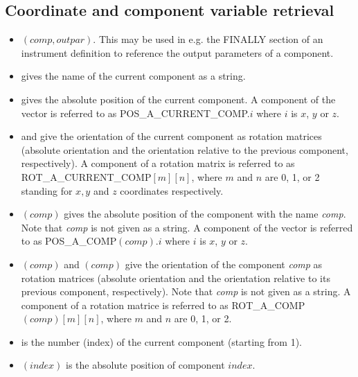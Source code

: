 \subsection{Coordinate and component variable retrieval}

\begin{itemize}
\item {}$(comp, outpar)$. This may be used in e.g. the FINALLY section of an
  instrument definition to reference the output parameters of a
  component.
\item {} gives the name of the current component as a string.
\item {} gives the absolute position of the
  current component. A component of the vector is referred to as
  POS\_A\_CURRENT\_COMP.$i$ where $i$ is $x$, $y$ or $z$.
\item {} and
   give the orientation
  of the current component as rotation matrices
  (absolute orientation and the orientation relative to
  the previous component, respectively). A
  component of a rotation matrix is referred to as
  ROT\_A\_CURRENT\_COMP$[m][n]$, where $m$ and
  $n$ are 0, 1, or 2 standing for $x,y$ and $z$ coordinates respectively.
\item {}$(comp)$ gives the absolute position
  of the component with the name {\em comp}. Note that
  {\em comp} is not given as a string. A component of the
  vector is referred to as POS\_A\_COMP$(comp).i$
  where $i$ is $x$, $y$ or $z$.
\item {}$(comp)$ and
  $(comp)$ give the orientation of the
  component {\em comp} as rotation matrices (absolute
  orientation and the orientation relative to its
  previous component, respectively). Note that {\em comp}
  is not given as a string. A component of  a rotation
  matrice is referred to as
  ROT\_A\_COMP$(comp)[m][n]$, where $m$ and $n$ are
  0, 1, or 2.
\item {} is the number (index) of the
       current component  (starting from 1).
\item {}$(index)$ is the absolute position of
  component $index$. \\

\end{itemize}
